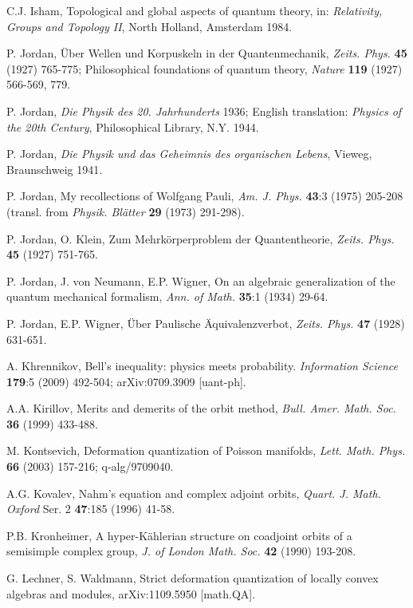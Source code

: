 \documentclass[12pt]{article}
\begin{document}
\begin{thebibliography}{000}
 C.J. Isham, Topological and global aspects of quantum theory, in: {\it
Relativity, Groups and Topology II}, North Holland, Amsterdam 1984.

 P. Jordan, \"Uber Wellen und Korpuskeln in der
Quantenmechanik, {\it Zeits. Phys.} {\bf 45} (1927) 765-775; Philosophical
foundations of quantum theory, {\it Nature} {\bf 119} (1927) 566-569, 779.

 P. Jordan, {\it Die Physik des 20. Jahrhunderts} 1936; English
translation: {\it Physics of the 20th Century}, Philosophical Library, N.Y. 1944.

 P. Jordan, {\it Die Physik und das Geheimnis des organischen Lebens}, 
Vieweg, Braunschweig 1941.

 P. Jordan, My recollections of Wolfgang Pauli, {\it Am. J. Phys.}
{\bf 43}:3 (1975) 205-208 (transl. from {\it Physik. Bl\"atter} {\bf 29} (1973) 291-298). 

 P. Jordan, O. Klein, Zum  Mehrk\"orperproblem der
Quantentheorie, {\it Zeits. Phys.} {\bf 45} (1927) 751-765.

 P. Jordan, J. von Neumann, E.P. Wigner, On an algebraic generalization of the 
quantum mechanical formalism, {\it Ann. of Math.} {\bf 35}:1 (1934) 29-64.

 P. Jordan, E.P. Wigner, \"Uber Paulische
\"Aquivalenzverbot, {\it Zeits. Phys.} {\bf 47} (1928) 631-651.

 A. Khrennikov, Bell's inequality: physics meets probability. 
{\it Information Science} {\bf 179}:5 (2009) 492-504; arXiv:0709.3909 [uant-ph].

 A.A. Kirillov, Merits and demerits of the orbit method, {\it
 Bull. Amer. Math. Soc.} {\bf 36} (1999) 433-488.

 M. Kontsevich, Deformation quantization of Poisson manifolds,
{\it Lett. Math. Phys.} {\bf 66} (2003) 157-216; q-alg/9709040. 

 A.G. Kovalev, Nahm's equation and complex adjoint orbits,
{\it Quart. J. Math. Oxford} Ser. 2 {\bf 47}:185 (1996) 41-58.

 P.B. Kronheimer, A hyper-K\"ahlerian structure on coadjoint orbits 
of a semisimple complex group, {\it J. of London Math. Soc.} {\bf 42} (1990) 193-208.
 
 G. Lechner, S. Waldmann, Strict deformation quantization of locally convex algebras and modules, arXiv:1109.5950 [math.QA].   


\end{thebibliography}
\end{document}
